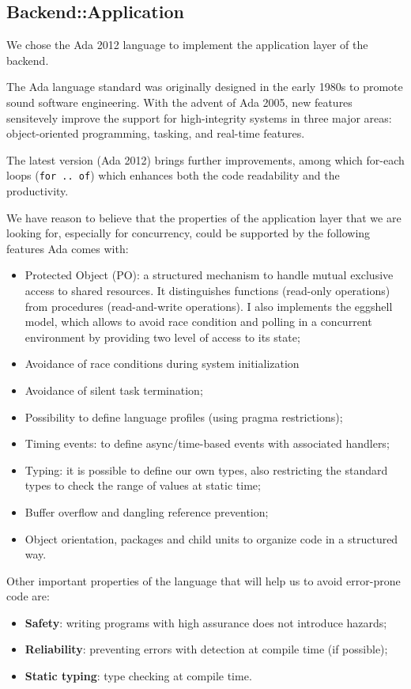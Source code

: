 \subsection{Backend::Application}
We chose the Ada 2012 language to implement the application layer of the
backend.

The Ada language standard was originally designed in the early 1980s to promote
sound software engineering. With the advent of Ada 2005, new features
sensitevely improve the support for high-integrity systems in three major
areas: object-oriented programming, tasking, and real-time features.

The latest version (Ada 2012) brings further improvements, among which for-each
loops (\texttt{for .. of}) which enhances both the code readability and the
productivity.

We have reason to believe that the properties of the application layer
that we are looking for, especially for concurrency, could be supported by the
following features Ada comes with:
\begin{itemize}
  \item Protected Object (PO): a structured mechanism to handle
        mutual exclusive access to shared resources.
        It distinguishes functions (read-only
        operations) from procedures (read-and-write operations). I also
        implements the eggshell model, which allows to avoid race condition and
        polling in a concurrent environment by providing two level of access
        to its state;
  \item Avoidance of race conditions during system initialization
  \item Avoidance of silent task termination;
  \item Possibility to define language profiles (using pragma restrictions);
  \item Timing events: to define async/time-based events with associated
        handlers;
  \item Typing: it is possible to define our own types, also restricting
  the standard types to check the range of values at static time;
  \item Buffer overflow and dangling reference prevention;
  \item Object orientation, packages and child units to organize code in a
  structured way.
\end{itemize}

Other important properties of the language that will help us to avoid
error-prone code are:
\begin{itemize}
  \item \textbf{Safety}: writing programs with high assurance does not
        introduce hazards;
  \item \textbf{Reliability}: preventing errors with detection at compile time
        (if possible);
  \item \textbf{Static typing}: type checking at compile time.
\end{itemize}

